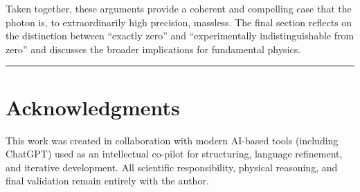 \documentclass[12pt,oneside]{scrartcl}
\renewcommand*{\bibfont}{\small}
\begin{document}
		Taken together, these arguments provide a coherent and compelling case 
		that the photon is, to extraordinarily high precision, massless. The 
		final section reflects on the distinction between ``exactly zero'' and 
		``experimentally indistinguishable from zero'' and discusses the broader 
		implications for fundamental physics.
	
	
	
	\vspace{1em}
	\hrule
	\vspace{2em}
	
	
	
	
	
	
	
	
	
	
	
	
	
	
	
	
	
	
	

	

	

	
	

	\section*{Acknowledgments}
	
	This work was created in collaboration with modern AI-based tools 
	(including ChatGPT) used as an intellectual co-pilot for structuring, 
	language refinement, and iterative development. All scientific 
	responsibility, physical reasoning, and final validation remain entirely 
	with the author.
	
	
	\renewcommand*{\bibfont}{\small}
\printbibliography

	
	
\end{document}
